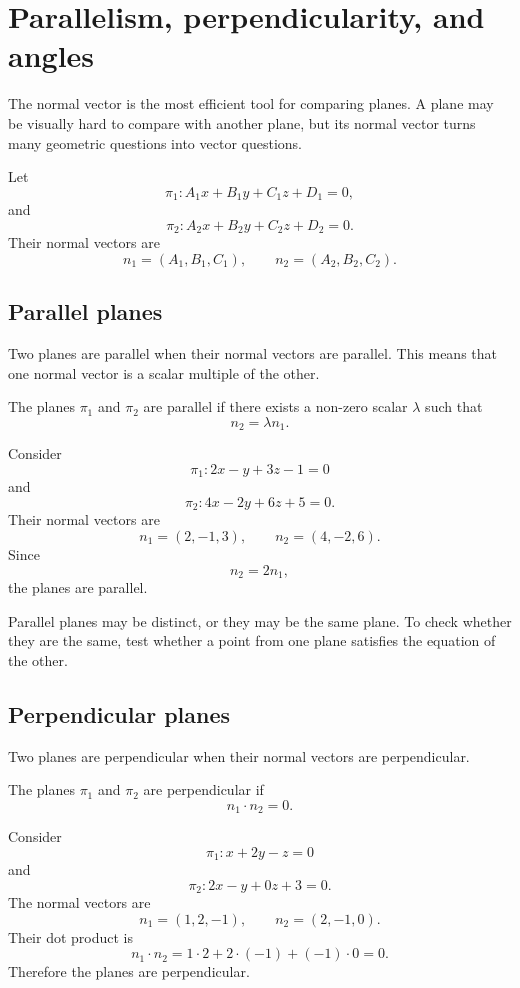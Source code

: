 \section{Parallelism, perpendicularity, and angles}

The normal vector is the most efficient tool for comparing planes. A plane may be visually hard to compare with another plane, but its normal vector turns many geometric questions into vector questions.

Let
\[
\pi_1:A_1x+B_1y+C_1z+D_1=0,
\]
and
\[
\pi_2:A_2x+B_2y+C_2z+D_2=0.
\]
Their normal vectors are
\[
n_1=(A_1,B_1,C_1),
\qquad
n_2=(A_2,B_2,C_2).
\]

\subsection*{Parallel planes}

Two planes are parallel when their normal vectors are parallel. This means that one normal vector is a scalar multiple of the other.

\begin{definitionbox}
The planes \(\pi_1\) and \(\pi_2\) are parallel if there exists a non-zero scalar \(\lambda\) such that
\[
n_2=\lambda n_1.
\]
\end{definitionbox}

\begin{examplebox}
Consider
\[
\pi_1:2x-y+3z-1=0
\]
and
\[
\pi_2:4x-2y+6z+5=0.
\]
Their normal vectors are
\[
n_1=(2,-1,3),
\qquad
n_2=(4,-2,6).
\]
Since
\[
n_2=2n_1,
\]
the planes are parallel.
\end{examplebox}

Parallel planes may be distinct, or they may be the same plane. To check whether they are the same, test whether a point from one plane satisfies the equation of the other.

\subsection*{Perpendicular planes}

Two planes are perpendicular when their normal vectors are perpendicular.

\begin{definitionbox}
The planes \(\pi_1\) and \(\pi_2\) are perpendicular if
\[
n_1\cdot n_2=0.
\]
\end{definitionbox}

\begin{examplebox}
Consider
\[
\pi_1:x+2y-z=0
\]
and
\[
\pi_2:2x-y+0z+3=0.
\]
The normal vectors are
\[
n_1=(1,2,-1),
\qquad
n_2=(2,-1,0).
\]
Their dot product is
\[
n_1\cdot n_2=1\cdot2+2\cdot(-1)+(-1)\cdot0=0.
\]
Therefore the planes are perpendicular.
\end{examplebox}


